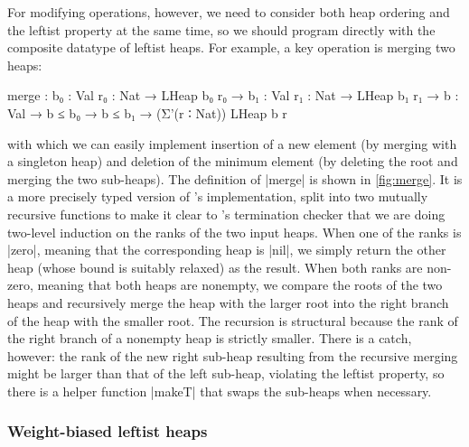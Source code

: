 For modifying operations, however, we need to consider both heap ordering and the leftist property at the same time, so we should program directly with the composite datatype of leftist heaps.
For example, a key operation is merging two heaps:
\begin{code}
merge :  {b₀  : Val} {r₀  : Nat} → LHeap b₀  r₀  →
         {b₁  : Val} {r₁  : Nat} → LHeap b₁  r₁  →
         {b   : Val} → b ≤ b₀ → b ≤ b₁ → (Σ'(r ∶ Nat)) LHeap b r
\end{code}
with which we can easily implement insertion of a new element (by merging with a singleton heap) and deletion of the minimum element (by deleting the root and merging the two sub-heaps).
The definition of |merge| is shown in \autoref{fig:merge}.
It is a more precisely typed version of \citeauthor{Okasaki-data-structures}'s implementation, split into two mutually recursive functions to make it clear to \Agda's termination checker that we are doing two-level induction on the ranks of the two input heaps.
When one of the ranks is |zero|, meaning that the corresponding heap is |nil|, we simply return the other heap (whose bound is suitably relaxed) as the result.
When both ranks are non-zero, meaning that both heaps are nonempty, we compare the roots of the two heaps and recursively merge the heap with the larger root into the right branch of the heap with the smaller root.
The recursion is structural because the rank of the right branch of a nonempty heap is strictly smaller.
There is a catch, however: the rank of the new right sub-heap resulting from the recursive merging might be larger than that of the left sub-heap, violating the leftist property, so there is a helper function |makeT| that swaps the sub-heaps when necessary.

\subsubsection{Weight-biased leftist heaps}

